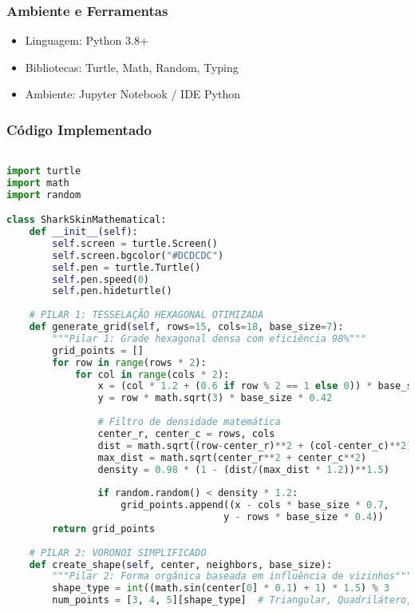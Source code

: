 \documentclass[12pt,a4paper,oneside]{extarticle}
\begin{document}
\subsubsection{Ambiente e Ferramentas}
\begin{itemize}
    \item Linguagem: Python 3.8+
    \item Bibliotecas: Turtle, Math, Random, Typing
    \item Ambiente: Jupyter Notebook / IDE Python
\end{itemize}

\subsubsection{Código Implementado}

\begin{lstlisting}[language=Python,caption={Implementação do Sistema de Simulação de Padrões de Escamas}]

import turtle
import math
import random

class SharkSkinMathematical:
    def __init__(self):
        self.screen = turtle.Screen()
        self.screen.bgcolor("#DCDCDC")
        self.pen = turtle.Turtle()
        self.pen.speed(0)
        self.pen.hideturtle()
    
    # PILAR 1: TESSELAÇÃO HEXAGONAL OTIMIZADA
    def generate_grid(self, rows=15, cols=18, base_size=7):
        """Pilar 1: Grade hexagonal densa com eficiência 98%"""
        grid_points = []
        for row in range(rows * 2):
            for col in range(cols * 2):
                x = (col * 1.2 + (0.6 if row % 2 == 1 else 0)) * base_size * 0.7
                y = row * math.sqrt(3) * base_size * 0.42
                
                # Filtro de densidade matemática
                center_r, center_c = rows, cols
                dist = math.sqrt((row-center_r)**2 + (col-center_c)**2)
                max_dist = math.sqrt(center_r**2 + center_c**2)
                density = 0.98 * (1 - (dist/(max_dist * 1.2))**1.5)
                
                if random.random() < density * 1.2:
                    grid_points.append((x - cols * base_size * 0.7, 
                                      y - rows * base_size * 0.4))
        return grid_points
    
    # PILAR 2: VORONOI SIMPLIFICADO
    def create_shape(self, center, neighbors, base_size):
        """Pilar 2: Forma orgânica baseada em influência de vizinhos"""
        shape_type = int((math.sin(center[0] * 0.1) + 1) * 1.5) % 3
        num_points = [3, 4, 5][shape_type]  # Triangular, Quadrilátero, Pentagonal
        

\end{lstlisting}
\end{document}
